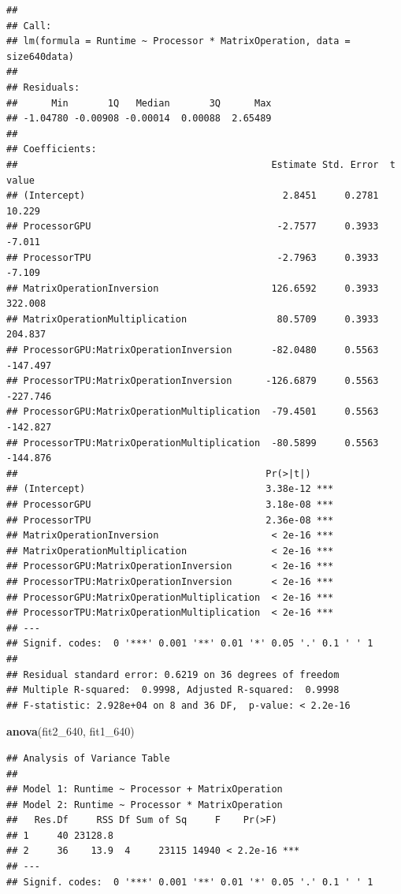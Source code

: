 \documentclass[
]{article}
\newenvironment{Shaded}{\begin{snugshade}}{\end{snugshade}}
\newcommand{\DecValTok}[1]{\textcolor[rgb]{0.00,0.00,0.81}{#1}}
\newcommand{\KeywordTok}[1]{\textcolor[rgb]{0.13,0.29,0.53}{\textbf{#1}}}
\newcommand{\NormalTok}[1]{#1}
\begin{document}
\begin{verbatim}
## 
## Call:
## lm(formula = Runtime ~ Processor * MatrixOperation, data = size640data)
## 
## Residuals:
##      Min       1Q   Median       3Q      Max 
## -1.04780 -0.00908 -0.00014  0.00088  2.65489 
## 
## Coefficients:
##                                             Estimate Std. Error  t value
## (Intercept)                                   2.8451     0.2781   10.229
## ProcessorGPU                                 -2.7577     0.3933   -7.011
## ProcessorTPU                                 -2.7963     0.3933   -7.109
## MatrixOperationInversion                    126.6592     0.3933  322.008
## MatrixOperationMultiplication                80.5709     0.3933  204.837
## ProcessorGPU:MatrixOperationInversion       -82.0480     0.5563 -147.497
## ProcessorTPU:MatrixOperationInversion      -126.6879     0.5563 -227.746
## ProcessorGPU:MatrixOperationMultiplication  -79.4501     0.5563 -142.827
## ProcessorTPU:MatrixOperationMultiplication  -80.5899     0.5563 -144.876
##                                            Pr(>|t|)    
## (Intercept)                                3.38e-12 ***
## ProcessorGPU                               3.18e-08 ***
## ProcessorTPU                               2.36e-08 ***
## MatrixOperationInversion                    < 2e-16 ***
## MatrixOperationMultiplication               < 2e-16 ***
## ProcessorGPU:MatrixOperationInversion       < 2e-16 ***
## ProcessorTPU:MatrixOperationInversion       < 2e-16 ***
## ProcessorGPU:MatrixOperationMultiplication  < 2e-16 ***
## ProcessorTPU:MatrixOperationMultiplication  < 2e-16 ***
## ---
## Signif. codes:  0 '***' 0.001 '**' 0.01 '*' 0.05 '.' 0.1 ' ' 1
## 
## Residual standard error: 0.6219 on 36 degrees of freedom
## Multiple R-squared:  0.9998, Adjusted R-squared:  0.9998 
## F-statistic: 2.928e+04 on 8 and 36 DF,  p-value: < 2.2e-16
\end{verbatim}

\begin{Shaded}
\begin{Highlighting}[]
\KeywordTok{anova}\NormalTok{(fit2\_}\DecValTok{640}\NormalTok{, fit1\_}\DecValTok{640}\NormalTok{)}
\end{Highlighting}
\end{Shaded}

\begin{verbatim}
## Analysis of Variance Table
## 
## Model 1: Runtime ~ Processor + MatrixOperation
## Model 2: Runtime ~ Processor * MatrixOperation
##   Res.Df     RSS Df Sum of Sq     F    Pr(>F)    
## 1     40 23128.8                                 
## 2     36    13.9  4     23115 14940 < 2.2e-16 ***
## ---
## Signif. codes:  0 '***' 0.001 '**' 0.01 '*' 0.05 '.' 0.1 ' ' 1
\end{verbatim}
\end{document}
